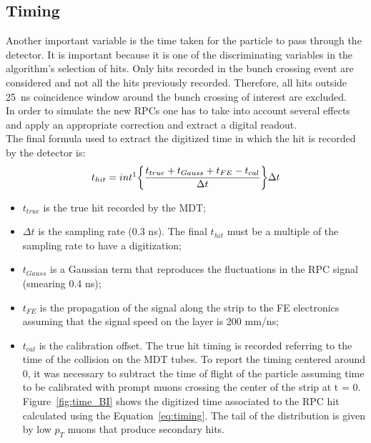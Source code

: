 \subsection{Timing}
\label{sec:timing}
Another important variable is the time taken for the particle to pass through the detector. It is 
important because it is one of the discriminating variables in the algorithm's selection of hits. 
Only hits recorded in the bunch crossing event are considered and not all the hits previously recorded. 
Therefore, all hits outside 25~ns coincidence window around the bunch crossing of interest are 
excluded.\\
In order to simulate the new RPCs one has to take into account several effects and apply an 
appropriate correction and extract a digital readout.
\vspace{\baselineskip}\\
The final formula used to extract the digitized time in which the hit is recorded by the detector is:
\begin{equation}
t_{hit}= int\footnotemark\bigg\{\frac{t_{true}+t_{Gauss}+t_{FE}-t_{cal}}{\Delta t}\bigg\}\Delta t
\label{eq:timing}
\end{equation}
\begin{itemize}
	\item $t_{true}$ is the true hit recorded by the MDT;
	\item $\Delta t$ is the sampling rate (0.3 ns). The final $t_{hit}$ must be a multiple of the sampling rate to have a digitization;
	\item $t_{Gauss}$ is a Gaussian term that reproduces the fluctuations in the RPC signal 
	(smearing 0.4 ns);
	\item $t_{FE}$ is the propagation of the signal along the strip to the FE electronics 
	assuming  that the signal speed on the layer is 200 mm/ns;
	\item $t_{cal}$ is the calibration offset. The true hit timing is recorded referring to the time 
	of the collision on the MDT tubes. To report the timing centered around 0, it was necessary to 
	subtract the time of flight of the particle assuming time to be calibrated with 
	prompt muons crossing the center of the strip at t = 0.
\vspace{\baselineskip}\\	
Figure~\ref{fig:time_BI} shows the digitized time associated to the RPC hit calculated using the 
Equation~\ref{eq:timing}. The tail of the distribution is given by low $p_T$ muons  that produce 
secondary hits.
\end{itemize} 

